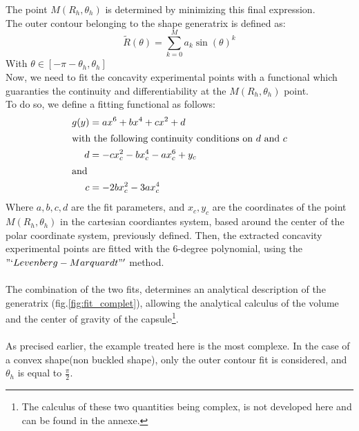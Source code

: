 The point $M(R_{h},\theta_h)$ is determined by minimizing this final expression.\\
The outer contour belonging to the shape generatrix is defined as:
\begin{equation*}
	\tilde{R}(\theta) = \sum\limits_{k=0}^M a_k \sin(\theta)^k
\end{equation*}
With $\theta \in[-\pi-\theta_h,\theta_h]$\\
Now, we need to fit the concavity experimental points with a functional which guaranties the continuity and differentiability at the $M(R_{h},\theta_h)$ point.\\
To do so, we define a fitting functional as follows:
\begin{align*}
g(y) &= a x^6+b x^4+ c x^2+ d\\
\intertext{with the following continuity conditions on $d$ and $c$}
d &= -c x_{c}^2 - b x_{c}^4 -ax_{c}^6+ y_c\\
\intertext{and}
c &= -2 b x_{c}^2-3 a x_{c}^4
\end{align*}
Where $a,b,c,d$ are the fit parameters, and $x_c,y_c$ are the coordinates of the point $M(R_{h},\theta_h)$ in the cartesian coordiantes system, based around the center of the polar coordinate system, previously defined. Then, the extracted concavity experimental points are fitted with the 6-degree polynomial, using the $"`Levenberg-Marquardt"'$ method. \\
\paragraph{}
The combination of the two fits, determines an analytical description of the generatrix (fig.\ref{fig:fit_complet}), allowing the analytical calculus of the volume and the center of gravity of the capsule\footnote{The calculus of these two quantities being complex, is not developed here and can be found in the annexe.}. 
\paragraph{}
As precised earlier, the example treated here is the most complexe. In the case of a convex shape(non buckled shape), only the outer contour fit is considered, and $\theta_h$ is equal to $\frac{\pi}{2}$.

